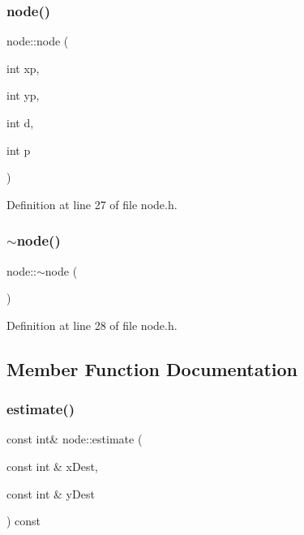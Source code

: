 \subsubsection{\texorpdfstring{node()}{node()}}
{\footnotesize\ttfamily node\+::node (\begin{DoxyParamCaption}\item[{int}]{xp,  }\item[{int}]{yp,  }\item[{int}]{d,  }\item[{int}]{p }\end{DoxyParamCaption})\hspace{0.3cm}{\ttfamily [inline]}}



Definition at line 27 of file node.\+h.

\mbox{\label{classnode_a482f83436a89f09d289b26144d817adf}} 
\subsubsection{\texorpdfstring{$\sim$node()}{~node()}}
{\footnotesize\ttfamily node\+::$\sim$node (\begin{DoxyParamCaption}{ }\end{DoxyParamCaption})\hspace{0.3cm}{\ttfamily [inline]}}



Definition at line 28 of file node.\+h.



\subsection{Member Function Documentation}
\mbox{\label{classnode_acd0a1c2330a9984fa120fe7a6f169680}} 
\subsubsection{\texorpdfstring{estimate()}{estimate()}}
{\footnotesize\ttfamily const int\& node\+::estimate (\begin{DoxyParamCaption}\item[{const int \&}]{x\+Dest,  }\item[{const int \&}]{y\+Dest }\end{DoxyParamCaption}) const\hspace{0.3cm}{\ttfamily [inline]}}



